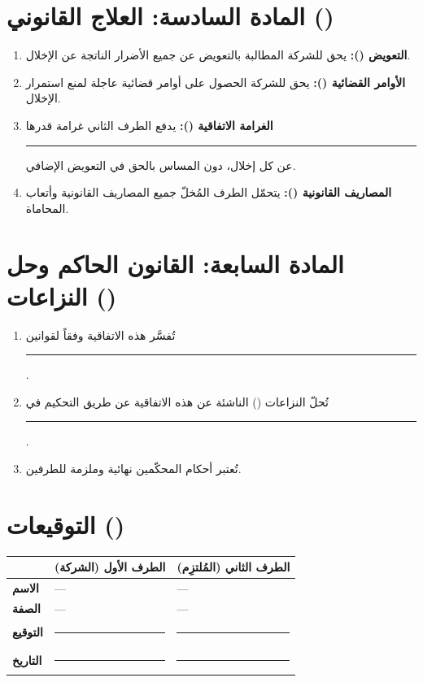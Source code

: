 \documentclass[12pt,a4paper]{article}
\begin{document}
\section{المادة السادسة: العلاج القانوني ()}
\label{sec:remedies}
\begin{enumerate}
    \item \textbf{التعويض ():} يحق للشركة المطالبة بالتعويض عن جميع الأضرار الناتجة عن الإخلال.
    \item \textbf{الأوامر القضائية ():} يحق للشركة الحصول على أوامر قضائية عاجلة لمنع استمرار الإخلال.
    \item \textbf{الغرامة الاتفاقية ():} يدفع الطرف الثاني غرامة قدرها \rule{3cm}{0.4pt} عن كل إخلال، دون المساس بالحق في التعويض الإضافي.
    \item \textbf{المصاريف القانونية ():} يتحمّل الطرف المُخلّ جميع المصاريف القانونية وأتعاب المحاماة.
\end{enumerate}

\section{المادة السابعة: القانون الحاكم وحل النزاعات ()}
\label{sec:law}
\begin{enumerate}
    \item تُفسَّر هذه الاتفاقية وفقاً لقوانين \rule{5cm}{0.4pt}.
    \item تُحلّ النزاعات () الناشئة عن هذه الاتفاقية عن طريق التحكيم في \rule{4cm}{0.4pt}.
    \item تُعتبر أحكام المحكّمين نهائية وملزمة للطرفين.
\end{enumerate}

\vspace{2em}
\section*{التوقيعات ()}

\begin{table}[H]
\centering
\renewcommand{\arraystretch}{2.5}
\begin{tabularx}{\textwidth}{L{5cm} X X}
\toprule
& \textbf{الطرف الأول (الشركة)} & \textbf{الطرف الثاني (المُلتزِم)} \\
\midrule
\textbf{الاسم} & --- & --- \\
\textbf{الصفة} & --- & --- \\
\textbf{التوقيع} & \rule{4cm}{0.4pt} & \rule{4cm}{0.4pt} \\
\textbf{التاريخ} & \rule{4cm}{0.4pt} & \rule{4cm}{0.4pt} \\
\bottomrule
\end{tabularx}
\end{table}
\end{document}
